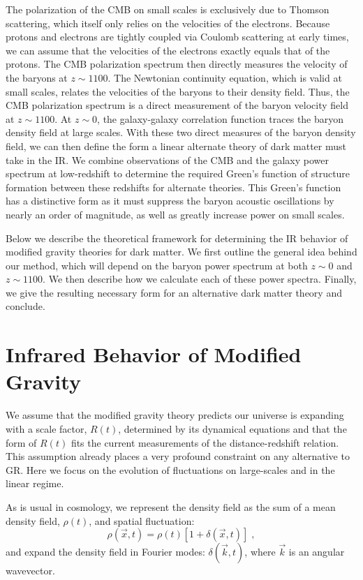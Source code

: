 \documentclass[floats,floatfix,showpacs,amssymb,amsmath,prl,twocolumn,superscriptaddress,nofootinbib, aps]{revtex4-2}
\begin{document}
The polarization of the CMB on small scales is exclusively due to Thomson scattering, which itself only relies on the velocities of the electrons. Because protons and electrons are tightly coupled via Coulomb scattering at early times, we can assume that the velocities of the electrons exactly equals that of the protons. The CMB polarization spectrum then directly measures the velocity of the baryons at $z\sim1100$. The Newtonian continuity equation, which is valid at small scales, relates the velocities of the baryons to their density field. Thus, the CMB polarization spectrum is a direct measurement of the baryon velocity field at $z\sim 1100$. At $z\sim 0$, the galaxy-galaxy correlation function traces the baryon density field at large scales. With these two direct measures of the baryon density field, we can then define the form a linear alternate theory of dark matter must take in the IR. We combine observations of the CMB and the galaxy power spectrum at low-redshift to determine the required Green's function of structure formation between these redshifts for alternate theories. This Green's function has a distinctive form as it must suppress the baryon acoustic oscillations by nearly an order of magnitude, as well as greatly increase power on small scales. 

Below we describe the theoretical framework for determining the IR behavior of modified gravity theories for dark matter. We first outline the general idea behind our method, which will depend on the baryon power spectrum at both $z\sim 0$ and $z\sim1100$. We then describe how we calculate each of these power spectra. Finally, we give the resulting necessary form for an alternative dark matter theory and conclude.

\section{Infrared Behavior of Modified Gravity}
We assume that the modified gravity theory predicts our universe is expanding with a scale factor, $R(t)$, determined by its dynamical equations and that the form of $R(t)$ fits the current measurements of the distance-redshift relation. This assumption already places a very profound constraint on any alternative to GR. Here we focus on the evolution of fluctuations on large-scales and in the linear regime.

As is usual in cosmology, we represent the density field as the sum of a mean density field, $\rho(t)$, and spatial fluctuation:
\begin{equation}
    \rho(\vec x,t) = \rho(t)\left[1 + \delta(\vec x,t)\right] \; ,
\end{equation}
and expand the density field in Fourier modes: $\delta(\vec k,t)$, where $\vec{k}$ is an angular wavevector.
\end{document}
